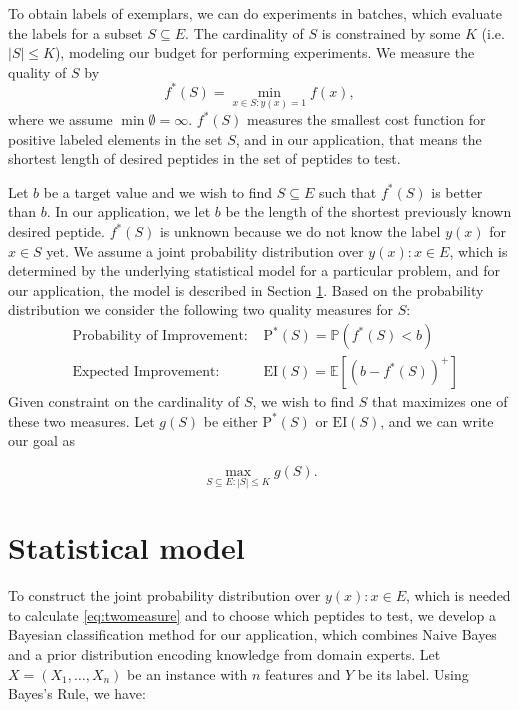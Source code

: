 \documentclass[12pt]{article}
\newcommand{\E}{\mathbb{E}}
\newcommand{\EI}{\mathrm{EI}}
\newcommand{\PI}{\text{P}^*}
\begin{document}
To obtain labels of exemplars, we can do experiments in batches, which evaluate the labels for a subset $S \subseteq E$. The cardinality of $S$ is constrained by some $K$ (i.e. $|S| \leq K$), modeling our budget for performing experiments. We measure the quality of $S$ by 
\begin{equation} \label{eq:fS}
f^*(S)= \underset{x \in S:y(x)=1}{\min} f(x),
\end{equation}
where we assume $\min \emptyset = \infty$. $f^*(S)$ measures the smallest cost function for positive labeled elements in the set $S$, and in our application, that means the shortest length of desired peptides in the set of peptides to test.


Let $b$ be a target value and we wish to find $S\subseteq E$ such that $f^*(S)$ is better than $b$. In our application, we let $b$ be the length of the shortest previously known desired peptide. $f^*(S)$ is unknown because we do not know the label $y(x)$ for $x \in S$ yet. We assume a joint probability distribution over $y(x): x \in E$, which is determined by the underlying statistical model for a particular problem, and for our application, the model is described in Section \ref{sec:stat model}. Based on the probability distribution we consider the following two quality measures for $S$:
\begin{equation} \label{eq:twomeasure}
  \begin{aligned}
    &\text{Probability of Improvement: }&\PI(S) = \mathbb{P}(f^*(S) < b)\\
    &\text{Expected Improvement: }&\EI(S) = \E [(b-f^*(S))^+]
  \end{aligned}
\end{equation}
Given constraint on the cardinality of $S$, we wish to find $S$ that maximizes one of these two measures. Let $g(S)$ be either $\PI(S)$ or $\EI(S)$, and we can write our goal as

\begin{equation}
  \max_{S \subseteq E: |S| \leq K} g(S). 
  \label{eq:opt}
\end{equation}

\section{Statistical model} \label{sec:stat model}
To construct the joint probability distribution over $y(x): x \in E$, which is needed to calculate \eqref{eq:twomeasure} and to choose which peptides to test, we develop a Bayesian classification method for our application, which combines Naive Bayes and a prior distribution encoding knowledge from domain experts. Let $X=(X_1,\ldots,X_n)$ be an instance with $n$ features and $Y$ be its label. Using Bayes's Rule, we have:
\end{document}
